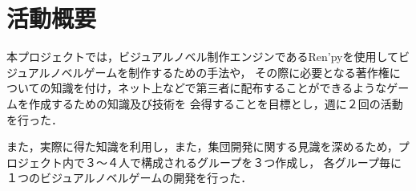 \section{活動概要}

  本プロジェクトでは，ビジュアルノベル制作エンジンであるRen'pyを使用してビジュアルノベルゲームを制作するための手法や，
  その際に必要となる著作権についての知識を付け，ネット上などで第三者に配布することができるようなゲームを作成するための知識及び技術を
  会得することを目標とし，週に２回の活動を行った．

  また，実際に得た知識を利用し，また，集団開発に関する見識を深めるため，プロジェクト内で３〜４人で構成されるグループを３つ作成し，
  各グループ毎に１つのビジュアルノベルゲームの開発を行った．
